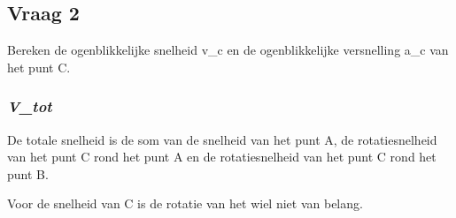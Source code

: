 \documentclass{article}
\begin{document}
\subsection{\textbf{Vraag 2}}
\begin{maplelatex}\begin{Maple Normal}{
Bereken de ogenblikkelijke snelheid v\_c en de ogenblikkelijke versnelling a\_c van het punt C.}\end{Maple Normal}
\end{maplelatex}
\subsubsection{\textbf{\textit{V\_tot}}}
\begin{maplelatex}\begin{Maple Normal}{
De totale snelheid is de som van de snelheid van het punt A, de rotatiesnelheid van het punt C rond het punt A en de rotatiesnelheid van het punt C rond het punt B.}\end{Maple Normal}
\end{maplelatex}
\begin{maplelatex}\begin{Maple Normal}{
Voor de snelheid van C is de rotatie van het wiel niet van belang.}\end{Maple Normal}
\end{maplelatex}
\begin{maplegroup}
\begin{mapleinput}
\end{mapleinput}
\mapleresult
{}
\end{maplegroup}
\end{document}
